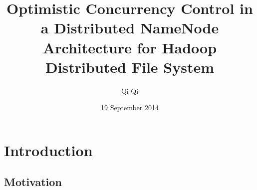 \documentclass{beamer}
\title[OCC for Hop-HDFS]{Optimistic Concurrency Control in a Distributed NameNode Architecture for Hadoop Distributed File System} %
\author{Qi Qi} %
\institute[IST/KTH/SICS] %
{
Instituto Superior T\'{e}cnico - IST (Portugal) \\ Royal Institute of Technology - KTH (Sweden) \\ 
Swedish Institute of Computer Science - SICS (Sweden) \\%
\medskip
\textit{qiq@kth.se} %
}
\date{19 September 2014} %
\begin{document}
\begin{frame}
\titlepage %
\end{frame}



\section{Introduction} %

\subsection{Motivation} %
\end{document}
